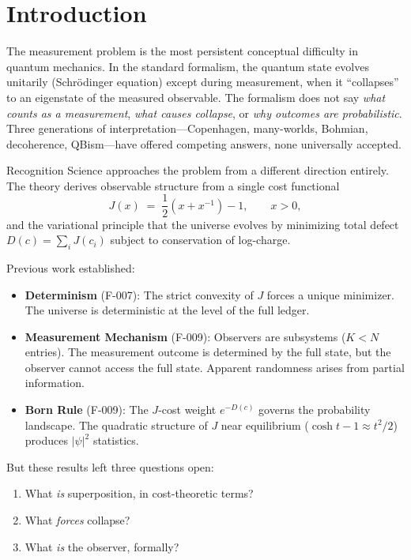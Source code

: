 \documentclass[11pt,a4paper]{article}
\theoremstyle{plain}
\theoremstyle{definition}
\theoremstyle{remark}
\newcommand{\Jcost}{J}
\begin{document}
\tableofcontents
\newpage

\section{Introduction}\label{sec:intro}

The measurement problem is the most persistent conceptual difficulty in quantum mechanics.
In the standard formalism, the quantum state evolves unitarily (Schr\"odinger equation) except during measurement, when it ``collapses'' to an eigenstate of the measured observable.
The formalism does not say \emph{what counts as a measurement}, \emph{what causes collapse}, or \emph{why outcomes are probabilistic}.
Three generations of interpretation---Copenhagen, many-worlds, Bohmian, decoherence, QBism---have offered competing answers, none universally accepted.

Recognition Science approaches the problem from a different direction entirely.
The theory derives observable structure from a single cost functional
\begin{equation}\label{eq:jcost}
\Jcost(x) \;=\; \frac{1}{2}\!\left(x + x^{-1}\right) - 1, \qquad x > 0,
\end{equation}
and the variational principle that the universe evolves by minimizing total defect $D(c) = \sum_i \Jcost(c_i)$ subject to conservation of log-charge.

Previous work established:
\begin{itemize}[nosep]
\item \textbf{Determinism} (F-007): The strict convexity of $\Jcost$ forces a unique minimizer.
The universe is deterministic at the level of the full ledger.
\item \textbf{Measurement Mechanism} (F-009): Observers are subsystems ($K < N$ entries).
The measurement outcome is determined by the full state, but the observer cannot access the full state.
Apparent randomness arises from partial information.
\item \textbf{Born Rule} (F-009): The $\Jcost$-cost weight $e^{-D(c)}$ governs the probability landscape.
The quadratic structure of $\Jcost$ near equilibrium ($\cosh t - 1 \approx t^2/2$) produces $|\psi|^2$ statistics.
\end{itemize}

But these results left three questions open:

\begin{enumerate}[nosep]
\item What \emph{is} superposition, in cost-theoretic terms?
\item What \emph{forces} collapse?
\item What \emph{is} the observer, formally?
\end{enumerate}
\end{document}
